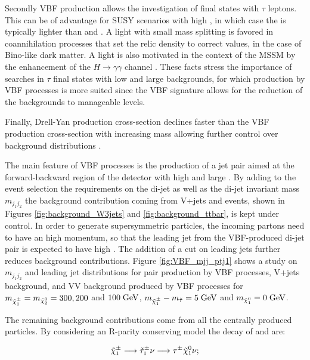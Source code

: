 Secondly VBF production allows the investigation of final states with $\tau$ leptons. This can be of advantage for SUSY scenarios with high \tanbeta, in which case the \stau is typically lighter than  \smuon and \selectron  \cite{Hinchliffe:1999zc}. A light \stau with small mass splitting is favored in coannihilation processes \cite{Griest:1990kh} that set the relic density to correct values, in the case of Bino-like dark matter. A light \stau is also motivated in the context of the MSSM by the enhancement of the $H \longrightarrow \gamma\gamma$ channel \cite{Carena:2011aa}. These facts stress the importance of searches in $\tau$ final states with low \pt and large backgrounds, for which production by VBF processes is more suited since the VBF signature allows for the reduction of the backgrounds to manageable levels.

Finally, Drell-Yan production cross-section declines faster than the VBF production cross-section with increasing mass allowing further control over background distributions \cite{Datta:2002vy}.

The main feature of VBF processes is the production of a jet pair aimed at the forward-backward region of the detector with high \pt and large \deltaeta. By adding to the event selection the requirements on the di-jet \deltaeta as well as the di-jet invariant mass \ensuremath{m_{j_{1}j_{2}}} the background contribution coming from V+jets and \ttbar events, shown in Figures \ref{fig:background_W3jets} and \ref{fig:background_ttbar}, is kept under control. In order to generate supersymmetric particles, the incoming partons need to have an high momentum, so that the leading jet from the VBF-produced di-jet pair is expected to have high \pt. The addition of a \pt cut on leading jets further reduces background contributions. Figure \ref{fig:VBF_mjj_ptj1} shows a study on \ensuremath{m_{j_{1}j_{2}}} and leading jet \pt distributions for \charginopm \charginopm pair production by VBF processes, V+jets background, and VV background produced by VBF processes for \ensuremath{m_{\charginopm} = m_{\neutralinotwo} = 300, 200} and \ensuremath{100\gev}, \ensuremath{m_{\charginopm} - m_{\tilde{\tau}} = 5\gev} and \ensuremath{m_{\neutralinoone} = 0\gev}.

The remaining background contributions come from all the centrally produced particles. By considering an R-parity conserving model the decay of \charginopm and \neutralinotwo are:

\begin{equation}
\tilde{\chi}^{\pm}_{1} \longrightarrow \tilde{\tau}_{1}^{\pm} \nu \longrightarrow \tau^{\pm} \tilde{\chi}^{0}_{1} \nu ;
\end{equation}

